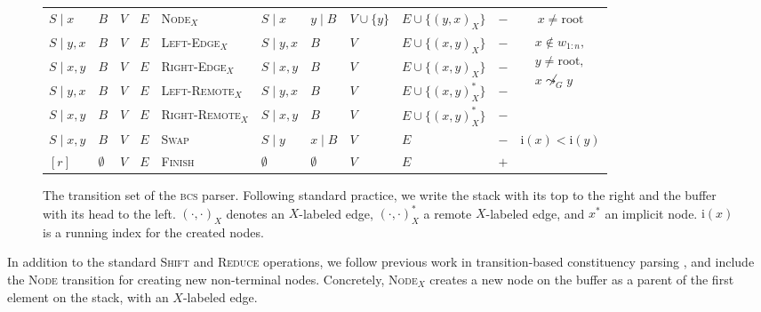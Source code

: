 \documentclass[11pt]{article}
\begin{document}
\begin{figure*}
\begin{adjustbox}{width=\textwidth,margin=3pt,frame}
\begin{tabular}{llll|l|llllc|c}
\cline{11-11}
$S \;|\; x$ & $B$ & $V$ & $E$ & \textsc{Node$_X$} & $S \;|\; x$ & $y \;|\; B$ & $V \cup \{ y \}$ & $E \cup \{ (y,x)_X \}$ & $-$ &
$x \neq \mathrm{root}$ \\
\cline{11-11}
\cline{11-11}
$S \;|\; y,x$ & $B$ & $V$ & $E$ & \textsc{Left-Edge$_X$} & $S \;|\; y,x$ & $B$ & $V$ & $E \cup \{ (x,y)_X \}$ & $-$ &
\multirow{4}{50pt}{$\begin{aligned}
x \not\in w_{1:n},\\
y \neq \mathrm{root},\\
x \not\leadsto_G y
\end{aligned}$} \\
$S \;|\; x,y$ & $B$ & $V$ & $E$ & \textsc{Right-Edge$_X$} & $S \;|\; x,y$ & $B$ & $V$ & $E \cup \{ (x,y)_X \}$ & $-$ & \\
$S \;|\; y,x$ & $B$ & $V$ & $E$ & \textsc{Left-Remote$_X$} & $S \;|\; y,x$ & $B$ & $V$ & $E \cup \{ (x,y)_X^* \}$ & $-$ & \\
$S \;|\; x,y$ & $B$ & $V$ & $E$ & \textsc{Right-Remote$_X$} & $S \;|\; x,y$ & $B$ & $V$ & $E \cup \{ (x,y)_X^* \}$ & $-$ & \\
\cline{11-11}
$S \;|\; x,y$ & $B$ & $V$ & $E$ & \textsc{Swap} & $S \;|\; y$ & $x \;|\; B$ & $V$ & $E$ & $-$ &
$\mathrm{i}(x) < \mathrm{i}(y)$ \\
\cline{11-11}
$[r]$ & $\emptyset$ & $V$ & $E$ & \textsc{Finish} & $\emptyset$ & $\emptyset$ & $V$ & $E$ & $+$ & \\
\end{tabular}
\end{adjustbox}
\caption{\label{fig:transitions}
  The transition set of the \textsc{bcs} parser. Following standard practice,
  we write the stack with its top to the right and the buffer with its head to the left.
  $(\cdot,\cdot)_X$ denotes an $X$-labeled edge, $(\cdot,\cdot)_X^*$ a remote $X$-labeled edge,
  and $x^*$ an implicit node. $\mathrm{i}(x)$ is a running index for the created nodes.
}
\end{figure*}

In addition to the standard \textsc{Shift} and \textsc{Reduce} operations, 
we follow previous work in transition-based constituency parsing \cite{zhu2013fast}, and include the \textsc{Node} transition for creating new non-terminal nodes.
Concretely, \textsc{Node$_X$} creates a new node on the buffer as a parent of the first element on the stack, with an $X$-labeled edge.
\end{document}
